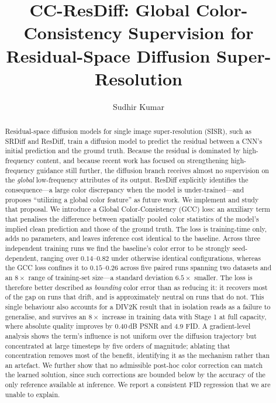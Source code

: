 \documentclass[11pt]{article}
\title{\textbf{CC-ResDiff: Global Color-Consistency Supervision for\\
Residual-Space Diffusion Super-Resolution}}
\author{Sudhir Kumar}
\date{}
\begin{document}
\maketitle

\begin{abstract}
Residual-space diffusion models for single image super-resolution (SISR), such
as SRDiff and ResDiff, train a diffusion model to predict the residual between a
CNN's initial prediction and the ground truth. Because the residual is dominated
by high-frequency content, and because recent work has focused on strengthening
high-frequency guidance still further, the diffusion branch receives almost no
supervision on the \emph{global} low-frequency attributes of its output. ResDiff
explicitly identifies the consequence---a large color discrepancy when the model
is under-trained---and proposes ``utilizing a global color feature'' as future
work. We implement and study that proposal. We introduce a Global
Color-Consistency (GCC) loss: an auxiliary term that penalises the difference
between spatially pooled color statistics of the model's implied clean prediction
and those of the ground truth. The loss is training-time only, adds no
parameters, and leaves inference cost identical to the baseline. Across three
independent training runs we find the baseline's color error to be strongly
seed-dependent, ranging over $0.14$--$0.82$ under otherwise identical
configurations, whereas the GCC loss confines it to $0.15$--$0.26$ across five
paired runs spanning two datasets and an $8\times$ range of training-set size---a
standard deviation $6.5\times$ smaller. The loss is therefore better described as
\emph{bounding} color error than as reducing it: it recovers most of the gap on
runs that drift, and is approximately neutral on runs that do not. This single
behaviour also accounts for a DIV2K result that in isolation reads as a failure
to generalise, and survives an $8\times$ increase in training data with Stage 1
at full capacity, where absolute quality improves by $0.40$\,dB PSNR and $4.9$
FID. A gradient-level analysis shows the term's influence is not
uniform over the diffusion trajectory but concentrated at large timesteps by five
orders of magnitude; ablating that concentration removes most of the benefit,
identifying it as the mechanism rather than an artefact. We further show that no
admissible post-hoc color correction can match the learned solution, since such
corrections are bounded below by the accuracy of the only reference available at
inference. We report a consistent FID regression that we are unable to explain.
\end{abstract}
\end{document}
